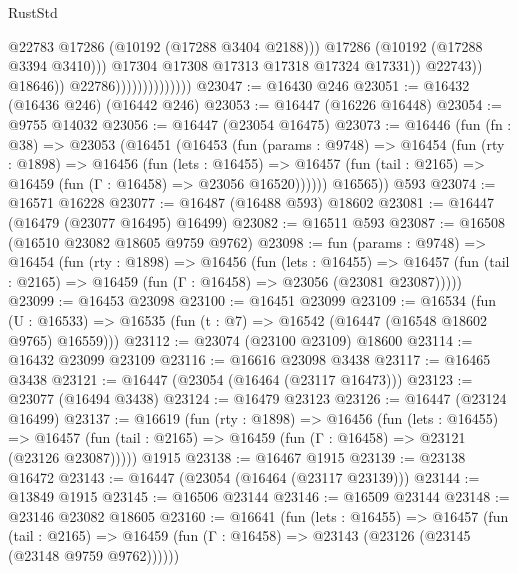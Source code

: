 \begin{lexlean}{RustStd}
\begin{coremodule}
                                                @22783
                                                @17286
                                                (@10192 (@17288 @3404 @2188)))
                                              @17286
                                              (@10192 (@17288 @3394 @3410)))
                                            @17304
                                            @17308
                                            @17313
                                            @17318
                                            @17324
                                            @17331))
                                        @22743))
                                    @18646))
                                @22786))))))))))))))
@23047 := @16430 @246
@23051 := @16432 (@16436 @246) (@16442 @246)
@23053 := @16447 (@16226 @16448)
@23054 := @9755 @14032
@23056 := @16447 (@23054 @16475)
@23073 := @16446
    (fun (fn : @38) =>
    @23053
      (@16451
        (@16453
          (fun (params : @9748) =>
          @16454
            (fun (rty : @1898) =>
            @16456
              (fun (lets : @16455) =>
              @16457 (fun (tail : @2165) => @16459 (fun (Γ : @16458) => @23056 @16520))))))
        @16565))
    @593
@23074 := @16571 @16228
@23077 := @16487 (@16488 @593) @18602
@23081 := @16447 (@16479 (@23077 @16495) @16499)
@23082 := @16511 @593
@23087 := @16508 (@16510 @23082 @18605 @9759 @9762)
@23098 := fun (params : @9748) =>
  @16454
    (fun (rty : @1898) =>
    @16456
      (fun (lets : @16455) =>
      @16457 (fun (tail : @2165) => @16459 (fun (Γ : @16458) => @23056 (@23081 @23087)))))
@23099 := @16453 @23098
@23100 := @16451 @23099
@23109 := @16534
    (fun (U : @16533) => @16535 (fun (t : @7) => @16542 (@16447 (@16548 @18602 @9765) @16559)))
@23112 := @23074 (@23100 @23109) @18600
@23114 := @16432 @23099 @23109
@23116 := @16616 @23098 @3438
@23117 := @16465 @3438
@23121 := @16447 (@23054 (@16464 (@23117 @16473)))
@23123 := @23077 (@16494 @3438)
@23124 := @16479 @23123
@23126 := @16447 (@23124 @16499)
@23137 := @16619
    (fun (rty : @1898) =>
    @16456
      (fun (lets : @16455) =>
      @16457 (fun (tail : @2165) => @16459 (fun (Γ : @16458) => @23121 (@23126 @23087)))))
    @1915
@23138 := @16467 @1915
@23139 := @23138 @16472
@23143 := @16447 (@23054 (@16464 (@23117 @23139)))
@23144 := @13849 @1915
@23145 := @16506 @23144
@23146 := @16509 @23144
@23148 := @23146 @23082 @18605
@23160 := @16641
    (fun (lets : @16455) =>
    @16457
      (fun (tail : @2165) =>
      @16459 (fun (Γ : @16458) => @23143 (@23126 (@23145 (@23148 @9759 @9762))))))

\end{coremodule}
\end{lexlean}
